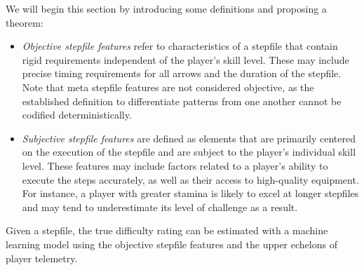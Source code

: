 We will begin this section by introducing some definitions and proposing a theorem:

\begin{itemize}
    \item \textit{Objective stepfile features} refer to characteristics of a stepfile that contain rigid requirements independent of the player's skill level. These may include precise timing requirements for all arrows and the duration of the stepfile. Note that meta stepfile features are not considered objective, as the established definition to differentiate patterns from one another cannot be codified deterministically. 
    \item \textit{Subjective stepfile features} are defined as elements that are primarily centered on the execution of the stepfile and are subject to the player's individual skill level. These features may include factors related to a player's ability to execute the steps accurately, as well as their access to high-quality equipment. For instance, a player with greater stamina is likely to excel at longer stepfiles and may tend to underestimate its level of challenge as a result. 
\end{itemize}

\begin{theorem}
Given a stepfile, the true difficulty rating can be estimated with a machine learning model using the objective stepfile features and the upper echelons of player telemetry.
\end{theorem}

